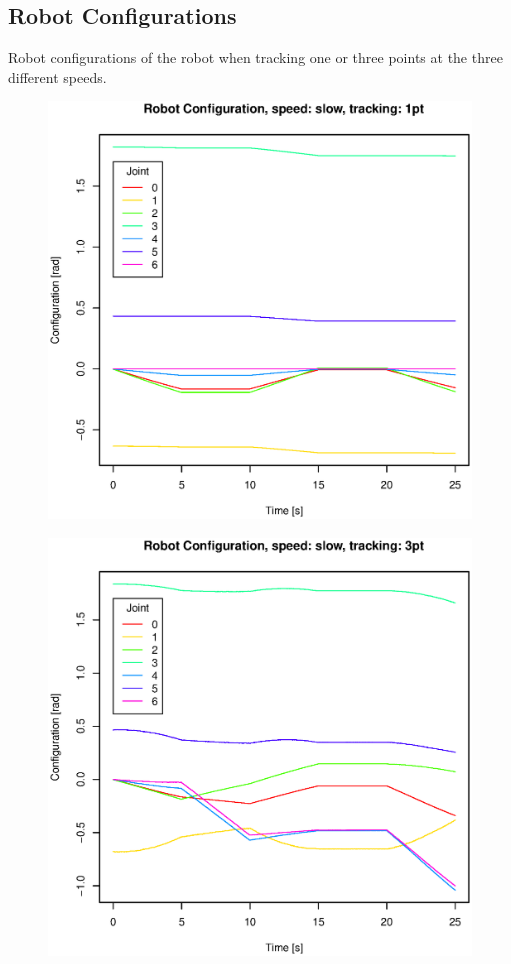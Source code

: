 \subsection{Robot Configurations}
Robot configurations of the robot when tracking one or three points at the three different speeds.
\begin{figure}[H]
\centering
\includegraphics[width= \linewidth]{graphics/robotics/robotConfiguration_slow_1pt}
\caption{}
\label{fig:}
\end{figure}

\begin{figure}[H]
\centering
\includegraphics[width= \linewidth]{graphics/robotics/robotConfiguration_slow_3pt}
\caption{}
\label{fig:}
\end{figure}

